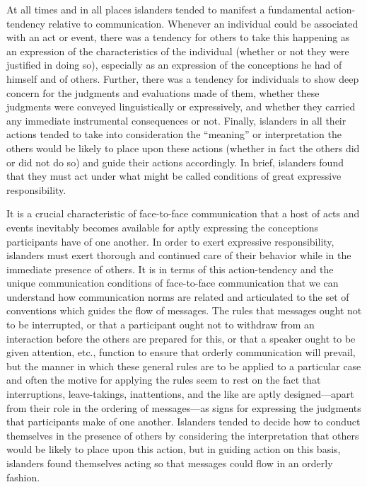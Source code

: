 \documentclass[openany,nobib]{tufte-book}
\begin{document}
At all times and in all places islanders tended to manifest a
fundamental action-tendency relative to communication. Whenever an
individual could be associated with an act or event, there was a
tendency for others to take this happening as an expression of the
characteristics of the individual (whether or not they were justified in
doing so), especially as an expression of the conceptions he had of
himself and of others. Further, there was a tendency for individuals to
show deep concern for the judgments and evaluations made of them,
whether these judgments were conveyed linguistically or expressively,
and whether they carried any immediate instrumental consequences or not.
Finally, islanders in all their actions tended to take into
consideration the ``meaning'' or interpretation the others would be
likely to place upon these actions (whether in fact the others did or
did not do so) and guide their actions accordingly. In brief, islanders
found that they must act under what might be called conditions of great
expressive responsibility.

It is a crucial characteristic of face-to-face communication that a host
of acts and events inevitably becomes available for aptly expressing the
conceptions participants have of one another. In order to exert
expressive responsibility, islanders must exert thorough and continued
care of their behavior while in the immediate presence of others. It is
in terms of this action-tendency and the unique communication conditions
of face-to-face communication that we can understand how communication
norms are related and articulated to the set of conventions which guides
the flow of messages. The rules that messages ought not to be
interrupted, or that a participant ought not to withdraw from an
interaction before the others are prepared for this, or that a speaker
ought to be given attention, etc., function to ensure that orderly
communication will prevail, but the manner in which these general rules
are to be applied to a particular case and often the motive for applying
the rules seem to rest on the fact that interruptions, leave-takings,
inattentions, and the like are aptly designed---apart from their role in
the ordering of messages---as signs for expressing the judgments that
participants make of one another. Islanders tended to decide how to
conduct themselves in the presence of others by considering the
interpretation that others would be likely to place upon this action,
but in guiding action on this basis, islanders found themselves acting
so that messages could flow in an orderly fashion.
\end{document}
